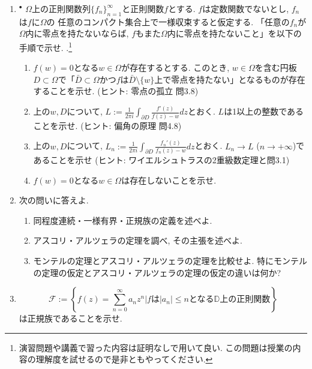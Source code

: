 \documentclass[dvipdfmx,a4paper,11pt]{article}
\newcommand{\C}{\mathbb{C}}
\newcommand{\D}{\mathbb{D}}
\theoremstyle{definition}
\begin{document}
\begin{enumerate}[label=\textbf{問}8.\arabic*]
 \item $^{\bullet}$ $\Omega$上の正則関数列$\{ f_{n}\}_{n=1}^{\infty}$と正則関数$f$とする. $f$は定数関数でないとし, $f_n$は$f$に$\Omega$の 任意のコンパクト集合上で一様収束すると仮定する. 
「任意の$f_{n}$が$\Omega$内に零点を持たないならば, $f$もまた$\Omega$内に零点を持たないこと」を以下の手順で示せ. .\footnote{演習問題や講義で習った内容は証明なしで用いて良い. この問題は授業の内容の理解度を試せるので是非ともやってください.}
 \begin{enumerate}
\setlength{\parskip}{0cm} 
  \setlength{\itemsep}{0cm} 
  \item $f(w)=0$となる$w \in \Omega$が存在するとする. このとき, $w \in\Omega$を含む円板$D \subset \Omega$で「$\bar{D} \subset \Omega$かつ$f$は$\bar{D} \setminus \{ w\}$上で零点を持たない」となるものが存在することを示せ. (ヒント: 零点の孤立 問3.8)
  \item 上の$w, D$について, $L := \frac{1}{2 \pi i} \int_{\partial D}\frac{f'(z)}{f(z) - w} dz$とおく. $L$は1以上の整数であることを示せ. (ヒント: 偏角の原理 問4.8)
  \item 上の$w, D$について, $L_{n} :=  \frac{1}{2 \pi i} \int_{\partial D}\frac{f_{n}'(z)}{f_{n}(z) - w} dz$とおく. $L_{n} \to L$ ($n \to + \infty$)であることを示せ (ヒント: ワイエルシュトラスの2重級数定理と問3.1)
  \item $f(w)=0$となる$w \in \Omega$は存在しないことを示せ.
 \end{enumerate} 
    
\item 次の問いに答えよ.
\vspace{-12pt}
 \begin{enumerate}
\setlength{\parskip}{0cm} 
  \setlength{\itemsep}{0cm} 
  \item 同程度連続・一様有界・正規族の定義を述べよ.
  \item アスコリ・アルツェラの定理を調べ, その主張を述べよ.
  \item モンテルの定理とアスコリ・アルツェラの定理を比較せよ. 特にモンテルの定理の仮定とアスコリ・アルツェラの定理の仮定の違いは何か?
    \end{enumerate} 

\item $$\mathcal{F} := \left\{ f(z) = \sum_{n=0}^{\infty}a_n z^n | \text{$f$は$|a_n| \le n$となる$\D$上の正則関数}\right\}$$
は正規族であることを示せ.
  
  
 
 
   \end{enumerate}
  
\end{document}
